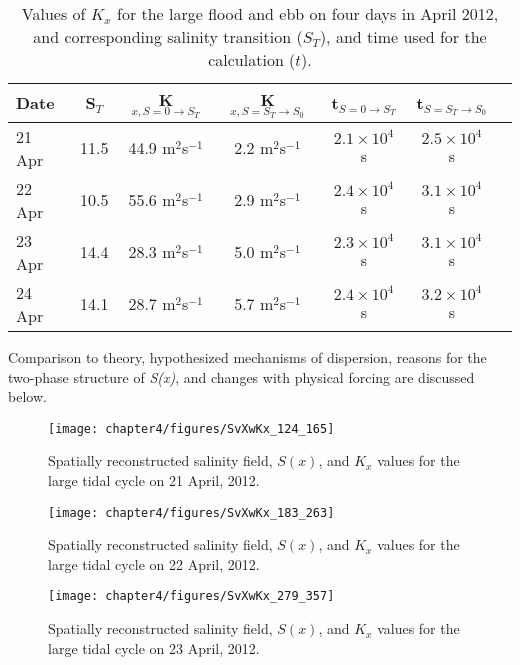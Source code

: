\begin{table}[h]
\renewcommand{\arraystretch}{1.3}

	\begin{center}
		\begin{tabular}{| l || c | c | c | c | c | c |}
		\hline
		Date & S$_{T}$ & K$_{x,S=0 \rightarrow S_T}$ &  K$_{x,S=S_T \rightarrow S_0}$ & t$_{S=0 \rightarrow S_T}$ & t$_{S=S_T \rightarrow S_0}$\\
		\hline \hline
		21 Apr & 11.5 & 44.9 m$^2$s$^{-1}$ & 2.2 m$^2$s$^{-1}$ & $2.1\times10^4$ s & $2.5\times10^4$ s\\  
		22 Apr & 10.5 & 55.6 m$^2$s$^{-1}$ & 2.9 m$^2$s$^{-1}$ & $2.4\times10^4$ s & $3.1\times10^4$ s\\ 
		23 Apr & 14.4 & 28.3 m$^2$s$^{-1}$ & 5.0 m$^2$s$^{-1}$ & $2.3\times10^4$ s & $3.1\times10^4$ s\\  
		24 Apr & 14.1 & 28.7 m$^2$s$^{-1}$ & 5.7 m$^2$s$^{-1}$ & $2.4\times10^4$ s & $3.2\times10^4$ s\\    \hline 
	\end{tabular}
	\caption{Values of $K_x$ for the large flood and ebb on four days in April 2012, and corresponding salinity transition ($S_T$), and time used for the calculation ($t$).} \label{tab:Kxtable}
\end{center}
\end{table}


Comparison to theory, hypothesized mechanisms of dispersion, reasons for the two-phase structure of \emph{S(x)}, and changes with physical forcing are discussed below. 
\begin{figure}[hp]
\centering
	\texttt{[image: chapter4/figures/SvXwKx\_124\_165]} 
\caption{Spatially reconstructed salinity field, $S(x)$, and $K_x$ values for the large tidal cycle on 21 April, 2012. } \label{fig:Kx421}
\end{figure}

\begin{figure}[hp]
\centering
	\texttt{[image: chapter4/figures/SvXwKx\_183\_263]} 
\caption{Spatially reconstructed salinity field, $S(x)$, and $K_x$ values for the large tidal cycle on 22 April, 2012. } \label{fig:Kx422}
\end{figure}

\begin{figure}[hp]
\centering
	\texttt{[image: chapter4/figures/SvXwKx\_279\_357]} 
\caption{Spatially reconstructed salinity field, $S(x)$, and $K_x$ values for the large tidal cycle on 23 April, 2012. } \label{fig:Kx423}
\end{figure}

